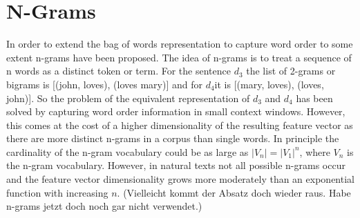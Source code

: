 \documentclass[Thesis.tex]{subfiles}
\begin{document}
\section{N-Grams}

In order to extend the bag of words representation to capture word
order to some extent n-grams have been proposed. The idea of n-grams
is to treat a sequence of n words as a distinct token or term. For
the sentence $d_{3}$ the list of 2-grams or bigrams is {[}(john,
loves), (loves mary){]} and for $d_{4}$it is {[}(mary, loves), (loves,
john){]}. So the problem of the equivalent representation of $d_{3}$
and $d_{4}$ has been solved by capturing word order information in
small context windows. However, this comes at the cost of a higher
dimensionality of the resulting feature vector as there are more distinct
n-grams in a corpus than single words. In principle the cardinality
of the n-gram vocabulary could be as large as $|V_{n}|=|V_{1}|^{n}$,
where $V_{n}$ is the n-gram vocabulary. However, in natural texts
not all possible n-grams occur and the feature vector dimensionality
grows more moderately than an exponential function with increasing
$n$.   (Vielleicht kommt der Absatz doch wieder raus. Habe n-grams jetzt doch noch gar nicht verwendet.)
\end{document}
